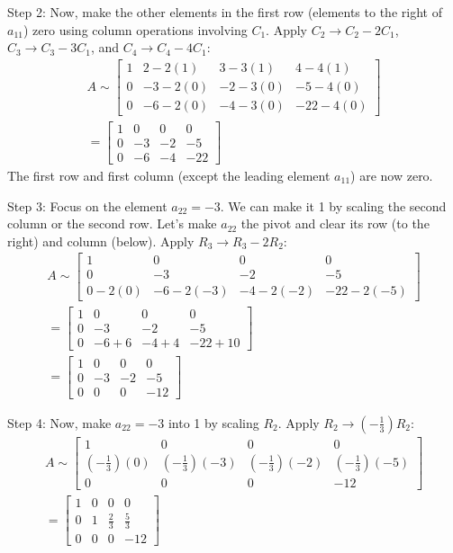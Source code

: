 \documentclass{article}
\begin{document}
Step 2: Now, make the other elements in the first row (elements to the right of $a_{11}$) zero using column operations involving $C_1$.
Apply $C_2 \to C_2 - 2C_1$, $C_3 \to C_3 - 3C_1$, and $C_4 \to C_4 - 4C_1$:
\begin{align*} A \sim \begin{bmatrix} 1 & 2 - 2(1) & 3 - 3(1) & 4 - 4(1) \\ 0 & -3 - 2(0) & -2 - 3(0) & -5 - 4(0) \\ 0 & -6 - 2(0) & -4 - 3(0) & -22 - 4(0) \end{bmatrix} \\ = \begin{bmatrix} 1 & 0 & 0 & 0 \\ 0 & -3 & -2 & -5 \\ 0 & -6 & -4 & -22 \end{bmatrix}\end{align*}
The first row and first column (except the leading element $a_{11}$) are now zero.

Step 3: Focus on the element $a_{22} = -3$. We can make it 1 by scaling the second column or the second row. Let's make $a_{22}$ the pivot and clear its row (to the right) and column (below).
Apply $R_3 \to R_3 - 2R_2$:
\begin{align*} A \sim \begin{bmatrix} 1 & 0 & 0 & 0 \\ 0 & -3 & -2 & -5 \\ 0 - 2(0) & -6 - 2(-3) & -4 - 2(-2) & -22 - 2(-5) \end{bmatrix} \\ = \begin{bmatrix} 1 & 0 & 0 & 0 \\ 0 & -3 & -2 & -5 \\ 0 & -6 + 6 & -4 + 4 & -22 + 10 \end{bmatrix} \\ = \begin{bmatrix} 1 & 0 & 0 & 0 \\ 0 & -3 & -2 & -5 \\ 0 & 0 & 0 & -12 \end{bmatrix}\end{align*}

Step 4: Now, make $a_{22}=-3$ into 1 by scaling $R_2$.
Apply $R_2 \to (-\frac{1}{3})R_2$:
\begin{align*} A \sim \begin{bmatrix} 1 & 0 & 0 & 0 \\ (-\frac{1}{3})(0) & (-\frac{1}{3})(-3) & (-\frac{1}{3})(-2) & (-\frac{1}{3})(-5) \\ 0 & 0 & 0 & -12 \end{bmatrix} \\ = \begin{bmatrix} 1 & 0 & 0 & 0 \\ 0 & 1 & \frac{2}{3} & \frac{5}{3} \\ 0 & 0 & 0 & -12 \end{bmatrix}\end{align*}
\end{document}

